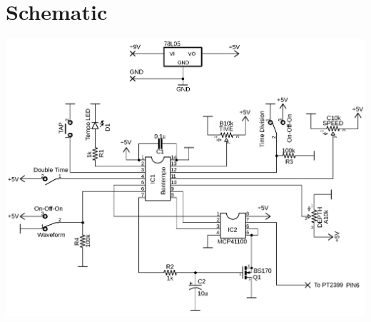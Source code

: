 \documentclass[a4paper, 10pt]{article}
\begin{document}
\section{Schematic}
\includegraphics[scale=1.1]{Schematic}
\end{document}
